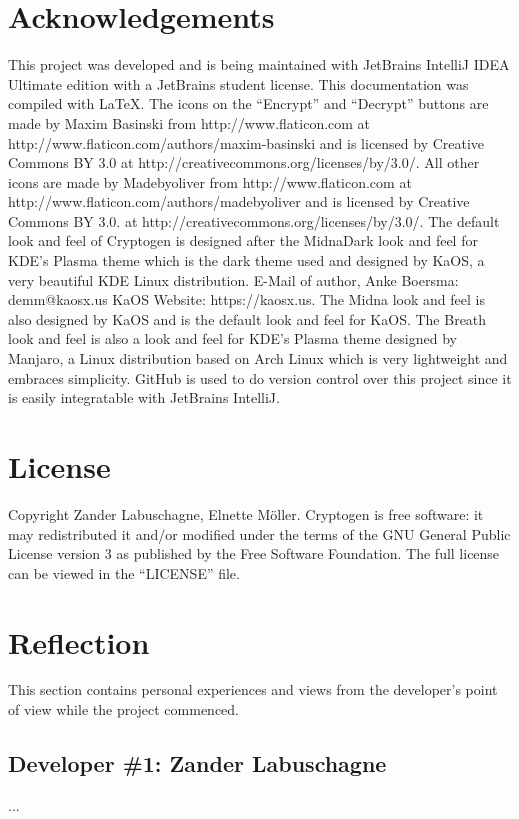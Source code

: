 \documentclass[11pt]{article}
\begin{document}
	\section{Acknowledgements}
	This project was developed and is being maintained with JetBrains IntelliJ IDEA Ultimate edition with a JetBrains student license. This documentation was compiled with \LaTeX. The icons on the ``Encrypt'' and ``Decrypt'' buttons are made by Maxim Basinski from http://www.flaticon.com at http://www.flaticon.com/authors/maxim-basinski and is licensed by Creative Commons BY 3.0 at http://creativecommons.org/licenses/by/3.0/. All other icons are made by Madebyoliver from http://www.flaticon.com at http://www.flaticon.com/authors/madebyoliver and is licensed by Creative Commons BY 3.0. at http://creativecommons.org/licenses/by/3.0/. The default look and feel of Cryptogen is designed after the MidnaDark look and feel for KDE's Plasma theme which is the dark theme used and designed by KaOS, a very beautiful KDE Linux distribution. E-Mail of author, Anke Boersma: demm@kaosx.us KaOS Website: https://kaosx.us. The Midna look and feel is also designed by KaOS and is the default look and feel for KaOS. The Breath look and feel is also a look and feel for KDE's Plasma theme designed by Manjaro, a Linux distribution based on Arch Linux which is very lightweight and embraces simplicity. GitHub is used to do version control over this project since it is easily integratable with JetBrains IntelliJ.

	\section{License}
	Copyright \textcopyright {} Zander Labuschagne, Elnette M\"oller. Cryptogen is free software: it may redistributed it and/or modified under the terms of the GNU General Public License version 3 as published by the Free Software Foundation. The full license can be viewed in the ``LICENSE'' file.

    \section{Reflection}
		This section contains personal experiences and views from the developer's point of view while the project commenced.\\
		\subsection{Developer \#1: Zander Labuschagne}
		...\\
\end{document}
